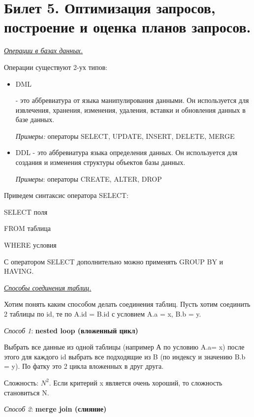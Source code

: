 \newpage
\section {Билет 5. Оптимизация запросов, построение и оценка планов запросов.}

\begin{center}
\textit{\underline{Операции в базах данных.}}
\end{center}

Операции существуют 2-ух типов: 
\begin{itemize}
    \item \hypertarget{DML_label}{DML} - это аббревиатура от языка манипулирования данными. Он используется для извлечения, хранения, изменения, удаления, вставки и обновления данных в базе данных.

\textit{Примеры:} операторы SELECT, UPDATE, INSERT, DELETE, MERGE

\item DDL - это аббревиатура языка определения данных. Он используется для создания и изменения структуры объектов базы данных.

\textit{Примеры}: операторы CREATE, ALTER, DROP
\end{itemize}

Приведем синтаксис оператора SELECT: 

SELECT поля

FROM таблица 

WHERE условия 

С оператором SELECT дополнительно можно применять GROUP BY и HAVING.  

\begin{center}
\textit{\underline{Способы соединения таблиц.}}
\end{center}

Хотим понять каким способом делать соединения таблиц. Пусть хотим соединить 2 таблицы по id, те по A.id = B.id с условием A.a = x, B.b = y.

\textit{Способ 1}: \textbf{nested loop (вложенный цикл)}

Выбрать все данные из одной таблицы (например А по условию A.a= x) после этого для каждого id выбрать все подходящие из B (по индексу и значению B.b = y). По фатку это 2 цикла вложенных в друг друга.

Сложность: $N^2$. Если критерий x является очень хороший, то сложность становиться N. 

\textit{Способ 2}: \textbf{merge join (слияние)}


